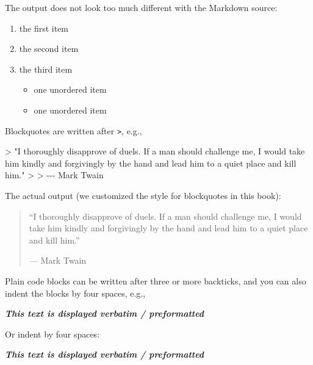 \documentclass[
]{book}
\newenvironment{Shaded}{\begin{snugshade}}{\end{snugshade}}
\newcommand{\AttributeTok}[1]{\textcolor[rgb]{0.77,0.63,0.00}{#1}}
\newcommand{\InformationTok}[1]{\textcolor[rgb]{0.56,0.35,0.01}{\textbf{\textit{#1}}}}
\newcommand{\NormalTok}[1]{#1}
\providecommand{\tightlist}{%
  \setlength{\itemsep}{0pt}\setlength{\parskip}{0pt}}
\begin{document}
The output does not look too much different with the Markdown source:

\begin{enumerate}
\def\labelenumi{\arabic{enumi}.}
\item
  the first item
\item
  the second item
\item
  the third item

  \begin{itemize}
  \tightlist
  \item
    one unordered item
  \item
    one unordered item
  \end{itemize}
\end{enumerate}

Blockquotes are written after \texttt{\textgreater{}}, e.g.,

\begin{Shaded}
\begin{Highlighting}[]
\AttributeTok{\textgreater{} "I thoroughly disapprove of duels. If a man should challenge me,}
\AttributeTok{  I would take him kindly and forgivingly by the hand and lead him}
\AttributeTok{  to a quiet place and kill him."}
\AttributeTok{\textgreater{}}
\AttributeTok{\textgreater{} {-}{-}{-} Mark Twain}
\end{Highlighting}
\end{Shaded}

The actual output (we customized the style for blockquotes in this
book):

\begin{quote}
``I thoroughly disapprove of duels. If a man should challenge me, I
would take him kindly and forgivingly by the hand and lead him to a
quiet place and kill him.''

--- Mark Twain
\end{quote}

Plain code blocks can be written after three or more backticks, and you
can also indent the blocks by four spaces, e.g.,

\begin{Shaded}
\begin{Highlighting}[]
\InformationTok{\textasciigrave{}\textasciigrave{}\textasciigrave{}}
\InformationTok{This text is displayed verbatim / preformatted}
\InformationTok{\textasciigrave{}\textasciigrave{}\textasciigrave{}}

\NormalTok{Or indent by four spaces:}

\InformationTok{    This text is displayed verbatim / preformatted}
\end{Highlighting}
\end{Shaded}
\end{document}
